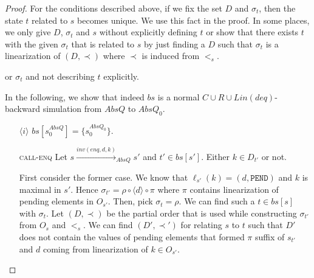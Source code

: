 \begin{proof}
For the conditions described above, if we fix the set $D$ and $\sigma_t$, then the state $t$ related to $s$ becomes unique. We use this fact in the proof. In some places, we only give $D$, $\sigma_t$ and $s$ without explicitly defining $t$ or show that there exists $t$ with the given $\sigma_t$ that is related to $s$ by just finding a $D$ such that $\sigma_t$ is a linearization of $(D, \prec)$ where $\prec$ is induced from $<_s$.

or $\sigma_t$ and not describing $t$ explicitly.

In the following, we show that indeed $bs$ is a normal $C\cup R\cup Lin(deq)$-backward simulation from $AbsQ$ to $AbsQ_0$. %

\begin{itemize}
\item[$\langle i \rangle$] $bs[s^{AbsQ}_0] = \{ s^{AbsQ_0}_0 \}$.

\item[\textsc{call-enq}] Let $s \xrightarrow{inv(enq,d,k)}_{AbsQ} s'$ and $t' \in bs[s']$. Either $k \in D_{t'}$ or not. 

First consider the former case. We know that $\ell_{s'}(k) = (d, \texttt{PEND})$ and $k$ is maximal in $s'$. Hence $\sigma_{t'} = \rho \circ \langle d \rangle \circ \pi$ where $\pi$ contains linearization of pending elements in $O_{s'}$. Then, pick $\sigma_t = \rho$. We can find such a $t \in bs[s]$ with $\sigma_t$. Let $(D, \prec)$ be the partial order that is used while constructing $\sigma_{t'}$ from $O_s$ and $<_s$. We can find $(D', \prec')$ for relating $s$ to $t$ such that $D'$ does not contain the values of pending elements that formed $\pi$ suffix of $s_{t'}$ and $d$ coming from linearization of $k \in O_{s'}$. 


\end{itemize}
\end{proof}
